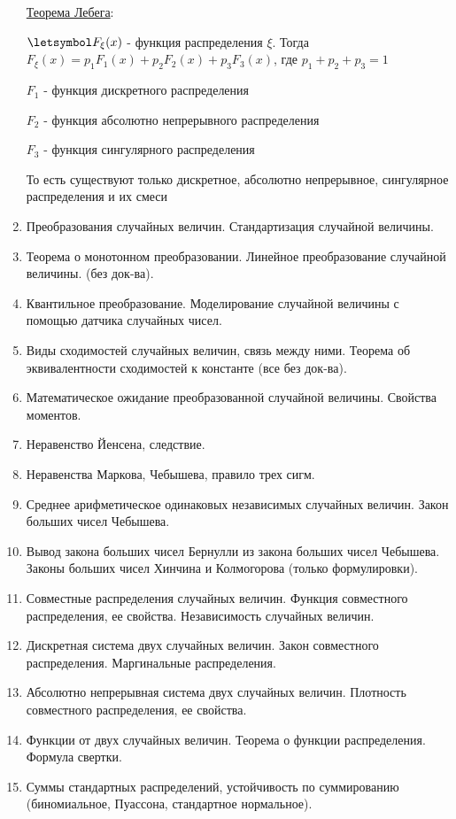 \begin{enumerate}
    \hyperlink{lebesguetheorem}{Теорема Лебега}: 

    $\letsymbol F_\xi(x)$ - функция распределения $\xi$. Тогда $F_\xi(x) = p_1 F_1(x) + p_2 F_2(x) + p_3 F_3(x)$, где $p_1 + p_2 + p_3 = 1$

    $F_1$ - функция дискретного распределения

    $F_2$ - функция абсолютно непрерывного распределения

    $F_3$ - функция сингулярного распределения

    То есть существуют только дискретное, абсолютно непрерывное, сингулярное распределения и их смеси


    \item Преобразования случайных величин. Стандартизация случайной величины. 
    \item Теорема о монотонном преобразовании. Линейное преобразование случайной величины. (без док-ва).
    \item Квантильное преобразование. Моделирование случайной величины с помощью датчика случайных чисел.
    \item Виды сходимостей случайных величин, связь между ними. Теорема об эквивалентности сходимостей к константе (все без док-ва).
    \item Математическое ожидание преобразованной случайной величины. Свойства моментов.
    \item Неравенство Йенсена, следствие.
    \item Неравенства Маркова, Чебышева, правило трех сигм.
    \item Среднее арифметическое одинаковых независимых случайных величин. Закон больших чисел Чебышева.
    \item Вывод закона больших чисел Бернулли из закона больших чисел Чебышева. Законы больших чисел Хинчина и Колмогорова (только формулировки).
    \item Совместные распределения случайных величин. Функция совместного распределения, ее свойства. Независимость случайных величин.
    \item Дискретная система двух случайных величин. Закон совместного распределения. Маргинальные распределения.
    \item Абсолютно непрерывная система двух случайных величин. Плотность совместного распределения, ее свойства.
    \item Функции от двух случайных величин. Теорема о функции распределения. Формула свертки.
    \item Суммы стандартных распределений, устойчивость по суммированию (биномиальное, Пуассона, стандартное нормальное).

\end{enumerate}
